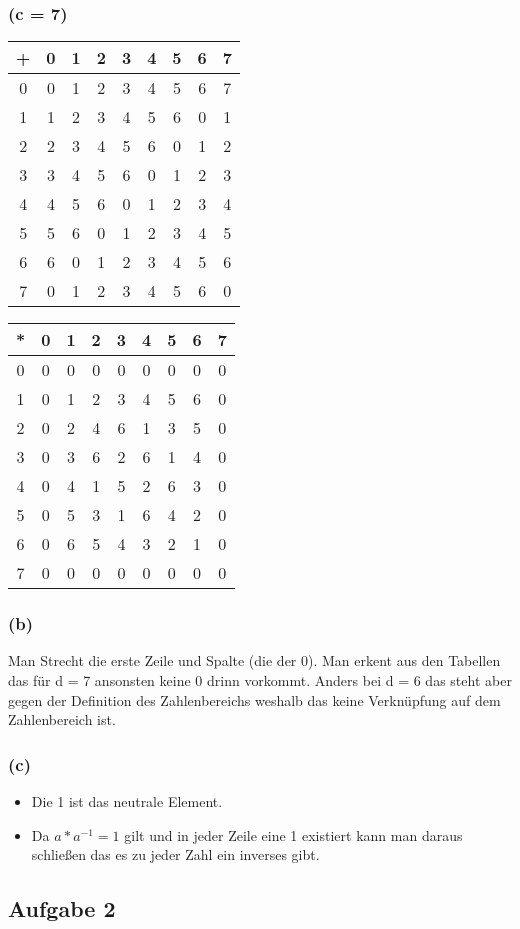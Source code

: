 \documentclass{article}
\begin{document}
\subsubsection*{(c = 7)}
\begin{center}
    \begin{tabular}{c|cccccccc}
        + & 0 & 1 & 2 & 3 & 4 & 5 & 6 & 7\\
        \hline
        0 & 0 & 1 & 2 & 3 & 4 & 5 & 6 & 7\\
        1 & 1 & 2 & 3 & 4 & 5 & 6 & 0 & 1\\
        2 & 2 & 3 & 4 & 5 & 6 & 0 & 1 & 2\\
        3 & 3 & 4 & 5 & 6 & 0 & 1 & 2 & 3\\
        4 & 4 & 5 & 6 & 0 & 1 & 2 & 3 & 4\\
        5 & 5 & 6 & 0 & 1 & 2 & 3 & 4 & 5\\
        6 & 6 & 0 & 1 & 2 & 3 & 4 & 5 & 6\\
        7 & 0 & 1 & 2 & 3 & 4 & 5 & 6 & 0\\
    \end{tabular}
\end{center}
    
\begin{center}
    \begin{tabular}{c|cccccccc}
        * & 0 & 1 & 2 & 3 & 4 & 5 & 6 & 7\\
        \hline
        0 & 0 & 0 & 0 & 0 & 0 & 0 & 0 & 0\\
        1 & 0 & 1 & 2 & 3 & 4 & 5 & 6 & 0\\
        2 & 0 & 2 & 4 & 6 & 1 & 3 & 5 & 0\\
        3 & 0 & 3 & 6 & 2 & 6 & 1 & 4 & 0\\
        4 & 0 & 4 & 1 & 5 & 2 & 6 & 3 & 0\\
        5 & 0 & 5 & 3 & 1 & 6 & 4 & 2 & 0\\
        6 & 0 & 6 & 5 & 4 & 3 & 2 & 1 & 0\\
        7 & 0 & 0 & 0 & 0 & 0 & 0 & 0 & 0\\
    \end{tabular}
        
\end{center}
\subsubsection*{(b)}
Man Strecht die erste Zeile und Spalte (die der 0). Man erkent aus den Tabellen das für d = 7 ansonsten keine 0 drinn vorkommt. Anders bei d = 6 das steht aber gegen der Definition des Zahlenbereichs weshalb das keine Verknüpfung auf dem Zahlenbereich ist.

\subsubsection*{(c)}
\begin{itemize}
    \item Die 1 ist das neutrale Element.
    \item Da \(a * a^{-1} = 1\) gilt und in jeder Zeile eine 1 existiert kann man daraus schließen das es zu jeder Zahl ein inverses gibt.
\end{itemize}

\subsection*{Aufgabe 2}

\end{document}
